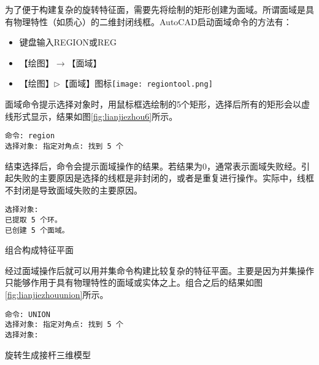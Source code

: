 \begin{procedure}
为了便于构建复杂的旋转特征面，需要先将绘制的矩形创建为面域。所谓面域是具有物理特性（如质心）的二维封闭线框。AutoCAD启动面域命令的方法有：
\begin{itemize}
\item 键盘输入REGION或REG
\item 【绘图】$\rightarrow$【面域】
\item 【绘图】$\triangleright$【面域】图标\texttt{[image: regiontool.png]}
\end{itemize}

\begin{figure}[htbp]
\centering
\begin{floatrow}[2]
\end{floatrow}
\end{figure}

面域命令提示选择对象时，用鼠标框选绘制的5个矩形，选择后所有的矩形会以虚线形式显示，结果如图\ref{fig:lianjiezhou6}所示。
\begin{lstlisting}
命令: region
选择对象: 指定对角点: 找到 5 个
\end{lstlisting}

结束选择后，命令会提示面域操作的结果。若结果为0，通常表示面域失败经。引起失败的主要原因是选择的线框是非封闭的，或者是重复进行操作。实际中，线框不封闭是导致面域失败的主要原因。
\begin{lstlisting}
选择对象:
已提取 5 个环。
已创建 5 个面域。
\end{lstlisting}
\item 组合构成特征平面

经过面域操作后就可以用并集命令构建比较复杂的特征平面。主要是因为并集操作只能够作用于具有物理特性的面域或实体之上。组合之后的结果如图\ref{fig:lianjiezhouunion}所示。
\begin{lstlisting}
命令: UNION
选择对象: 指定对角点: 找到 5 个
选择对象:
\end{lstlisting}

\begin{figure}[htbp]
\centering
\begin{floatrow}[2]
\end{floatrow}
\end{figure}
\item 旋转生成接杆三维模型


\end{procedure}
